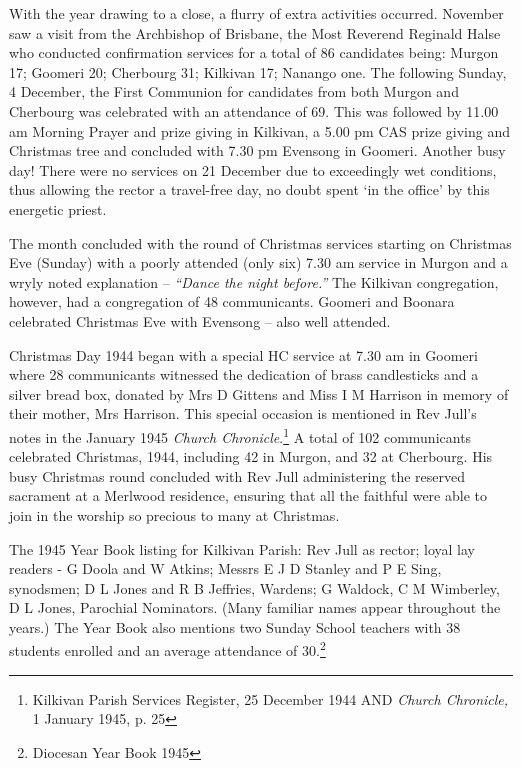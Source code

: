 With the year drawing to a close, a flurry of extra activities occurred. November saw a visit from the Archbishop of Brisbane, the Most Reverend Reginald Halse who conducted confirmation services for a total of 86 candidates being: Murgon 17; Goomeri 20; Cherbourg 31; Kilkivan 17; Nanango one. The following Sunday, 4 December, the First Communion for candidates from both Murgon and Cherbourg was celebrated with an attendance of 69. This was followed by 11.00 am Morning Prayer and prize giving in Kilkivan, a 5.00 pm CAS prize giving and Christmas tree and concluded with 7.30 pm Evensong in Goomeri. Another busy day! There were no services on 21 December due to exceedingly wet conditions, thus allowing the rector a travel-free day, no doubt spent `in the office' by this energetic priest.



The month concluded with the round of Christmas services starting on Christmas Eve (Sunday) with a poorly attended (only six) 7.30 am service in Murgon and a wryly noted explanation -- \emph{``Dance the night before.''} The Kilkivan congregation, however, had a congregation of 48 communicants. Goomeri and Boonara celebrated Christmas Eve with Evensong -- also well attended.



Christmas Day 1944 began with a special HC service at 7.30 am in Goomeri where 28 communicants witnessed the dedication of brass candlesticks and a silver bread box, donated by Mrs D Gittens and Miss I M Harrison in memory of their mother, Mrs Harrison. This special occasion is mentioned in Rev Jull's notes in the January 1945 \emph{Church Chronicle}.\footnote{Kilkivan Parish Services Register, 25 December 1944 AND \emph{Church Chronicle,} 1 January 1945, p. 25} A total of 102 communicants celebrated Christmas, 1944, including 42 in Murgon, and 32 at Cherbourg. His busy Christmas round concluded with Rev Jull administering the reserved sacrament at a Merlwood residence, ensuring that all the faithful were able to join in the worship so precious to many at Christmas.


The 1945 Year Book listing for Kilkivan Parish: Rev Jull as rector; loyal lay readers - G Doola and W Atkins; Messrs E J D Stanley and P E Sing, synodsmen; D L Jones and R B Jeffries, Wardens; G Waldock, C M Wimberley, D L Jones, Parochial Nominators. (Many familiar names appear throughout the years.) The Year Book also mentions two Sunday School teachers with 38 students enrolled and an average attendance of 30.\footnote{Diocesan Year Book 1945}


